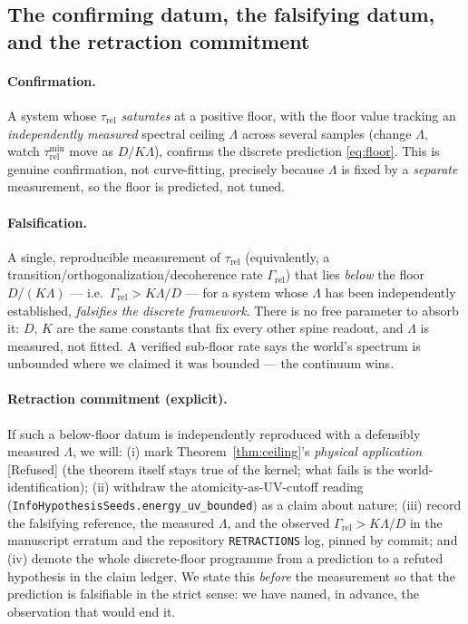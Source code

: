 \documentclass[10pt,twocolumn]{article}
\theoremstyle{definition}
\newcommand{\Refu}{\textsf{[Refused]}}
\newcommand{\code}[1]{\texttt{#1}}
\begin{document}


\subsection{The confirming datum, the falsifying datum, and the retraction commitment}
\label{sec:pred-retract}

\paragraph{Confirmation.} A system whose $\tau_{\mathrm{rel}}$ \emph{saturates} at a positive floor,
with the floor value tracking an \emph{independently measured} spectral ceiling $\Lambda$
across several samples (change $\Lambda$, watch $\tau_{\mathrm{rel}}^{\min}$ move as $D/K\Lambda$),
confirms the discrete prediction \eqref{eq:floor}. This is genuine confirmation, not
curve-fitting, precisely because $\Lambda$ is fixed by a \emph{separate} measurement, so
the floor is predicted, not tuned.

\paragraph{Falsification.} A single, reproducible measurement of $\tau_{\mathrm{rel}}$ (equivalently, a
transition/orthogonalization/decoherence rate $\Gamma_{\mathrm{rel}}$) that lies \emph{below} the floor
$D/(K\Lambda)$ --- i.e.\ $\Gamma_{\mathrm{rel}} > K\Lambda/D$ --- for a system whose $\Lambda$ has been
independently established, \emph{falsifies the discrete framework}. There is no free
parameter to absorb it: $D$, $K$ are the same constants that fix every other spine readout,
and $\Lambda$ is measured, not fitted. A verified sub-floor rate says the world's spectrum
is unbounded where we claimed it was bounded --- the continuum wins.

\paragraph{Retraction commitment (explicit).} If such a below-floor datum is
independently reproduced with a defensibly measured $\Lambda$, we will:
(i) mark Theorem~\ref{thm:ceiling}'s \emph{physical application} \Refu{}
(the theorem itself stays true of the kernel; what fails is the world-identification);
(ii) withdraw the atomicity-as-UV-cutoff reading
(\code{InfoHypothesisSeeds.energy\_uv\_bounded}) as a claim about nature;
(iii) record the falsifying reference, the measured $\Lambda$, and the observed
$\Gamma_{\mathrm{rel}}>K\Lambda/D$ in the manuscript erratum and the repository \code{RETRACTIONS} log,
pinned by commit; and (iv) demote the whole discrete-floor programme from a prediction to
a refuted hypothesis in the claim ledger. We state this \emph{before} the measurement so
that the prediction is falsifiable in the strict sense: we have named, in advance, the
observation that would end it.
\end{document}
